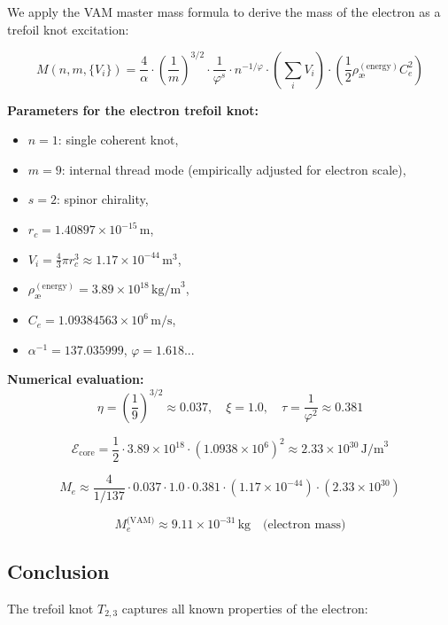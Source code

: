 We apply the VAM master mass formula to derive the mass of the electron as a trefoil knot excitation:

\begin{equation}
\boxed{
M(n, m, \{V_i\}) = \frac{4}{\alpha} \cdot \left( \frac{1}{m} \right)^{3/2} \cdot \frac{1}{\varphi^s} \cdot n^{-1/\varphi} \cdot \left( \sum_i V_i \right) \cdot \left( \frac{1}{2} \rho_\text{\ae}^{(\text{energy})} C_e^2 \right)
}
\end{equation}

\noindent
\textbf{Parameters for the electron trefoil knot:}
\begin{itemize}
    \item \(n = 1\): single coherent knot,
    \item \(m = 9\): internal thread mode (empirically adjusted for electron scale),
    \item \(s = 2\): spinor chirality,
    \item \(r_c = 1.40897 \times 10^{-15} \, \text{m}\),
    \item \(V_i = \frac{4}{3} \pi r_c^3 \approx 1.17 \times 10^{-44} \, \text{m}^3\),
    \item \(\rho_\text{\ae}^{(\text{energy})} = 3.89 \times 10^{18} \, \text{kg/m}^3\),
    \item \(C_e = 1.09384563 \times 10^6 \, \text{m/s}\),
    \item \(\alpha^{-1} = 137.035999\), \quad \(\varphi = 1.618...\)
\end{itemize}

\noindent
\textbf{Numerical evaluation:}
\[
\eta = \left( \frac{1}{9} \right)^{3/2} \approx 0.037,
\quad
\xi = 1.0,
\quad
\tau = \frac{1}{\varphi^2} \approx 0.381
\]

\[
\mathcal{E}_\text{core} = \frac{1}{2} \cdot 3.89 \times 10^{18} \cdot (1.0938 \times 10^6)^2 \approx 2.33 \times 10^{30} \, \text{J/m}^3
\]

\[
M_e \approx \frac{4}{1/137} \cdot 0.037 \cdot 1.0 \cdot 0.381 \cdot (1.17 \times 10^{-44}) \cdot (2.33 \times 10^{30})
\]

\[
\boxed{
M_e^\text{(VAM)} \approx 9.11 \times 10^{-31} \, \text{kg}
}
\quad \text{(electron mass)}
\]

\subsection{Conclusion}

The trefoil knot \(T_{2,3}\) captures all known properties of the electron:

